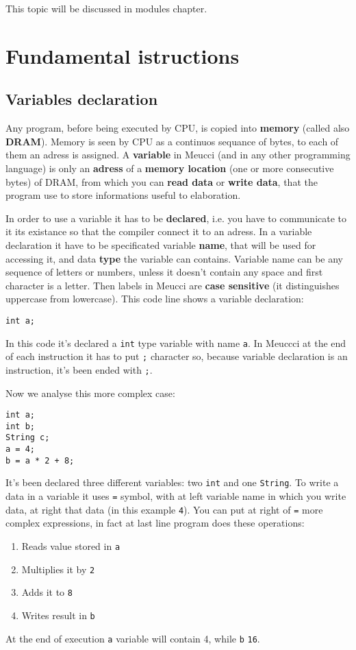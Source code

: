 \documentclass[10pt]{book}%
\newcommand{\code}[1]{\texttt{#1}}
\renewcommand{\emph}[1]{\textbf{#1}}
\newenvironment{codeenv}{
\begin{mdframed}[backgroundcolor=black!20,topline=false,leftline=false,rightline=false,bottomline=false]
}
{\end{mdframed}}
\begin{document}
This topic will be discussed in modules chapter.

\chapter{Fundamental istructions}
\section{Variables declaration}
Any program, before being executed by CPU, is copied into \emph{memory} (called also \emph{DRAM}). Memory is seen by CPU as a continuos sequance of bytes, to each of them an adress is assigned. A \emph{variable} in Meucci (and in any other programming language) is only an \emph{adress} of a \emph{memory location} (one or more consecutive bytes) of DRAM, from which you can \emph{read data} or \emph{write data}, that the program use to store informations useful to elaboration.

In order to use a variable it has to be \emph{declared}, i.e. you have to communicate to it its existance so that the compiler connect it to an adress. In a variable declaration it have to be specificated variable \emph{name}, that will be used for accessing it, and data \emph{type} the variable can contains. Variable name can be any sequence of letters or numbers, unless it doesn't contain any space and first character is a letter. Then labels in Meucci are \emph{case sensitive} (it distinguishes uppercase from lowercase). This code line shows a variable declaration:
\begin{codeenv}
\begin{verbatim}
int a;
\end{verbatim}
\end{codeenv}
In this code it's declared a \code{int} type variable with name \code{a}. In Meuccci at the end of each instruction it has to put \code{;} character so, because variable declaration is an instruction, it's been ended with \code{;}.

Now we analyse this more complex case:
\begin{codeenv}
\begin{verbatim}
int a;
int b;
String c;
a = 4;
b = a * 2 + 8;
\end{verbatim}
\end{codeenv}
It's been declared three different variables: two \code{int} and one \code{String}. To write a data in a variable it uses \code{=} symbol, with at left variable name in which you write data, at right that data (in this example \code{4}). You can put at right of \code{=} more complex expressions, in fact at last line program does these operations:
\begin{enumerate}
\item Reads value stored in \code{a}
\item Multiplies it by \code{2}
\item Adds it to \code 8
\item Writes result in \code b
\end{enumerate}
At the end of execution \code a variable will contain 4, while \code b \code{16}.
\end{document}
